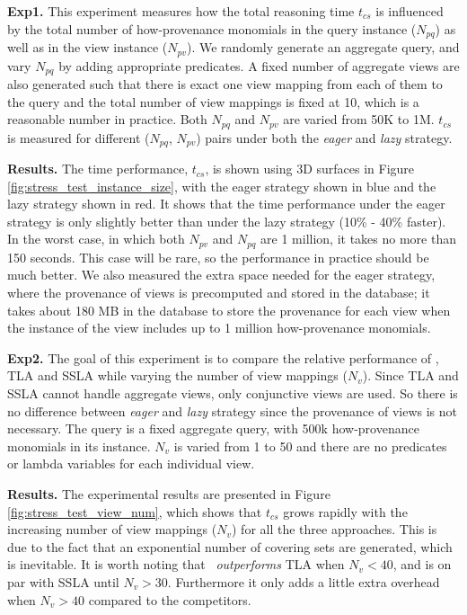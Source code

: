 \textbf{Exp1.}  This experiment measures how the total reasoning time $t_{cs}$ is influenced by the total number of how-provenance monomials in the query instance ($N_{pq}$) as well as 
in the view instance ($N_{pv}$). We randomly generate an aggregate query, and vary $N_{pq}$ by adding appropriate predicates. A fixed number of aggregate views are also generated such that there is exact one view mapping from each of them to the query and the total number of view mappings is fixed at 10, which is a reasonable number in practice. Both $N_{pq}$ and $N_{pv}$ are varied from 50K to 1M. $t_{cs}$ is measured for different ($N_{pq}$, $N_{pv}$) pairs under both the {\em eager} and {\em lazy} strategy.  

\textbf{Results.} 
The time performance, $t_{cs}$, is shown using 3D surfaces in Figure \ref{fig:stress_test_instance_size}, with the eager strategy shown in blue and the lazy strategy shown in red. It shows that the time performance under the eager strategy is only slightly better  than under the lazy strategy (10\% - 40\% faster). In the worst case, in which both $N_{pv}$ and $N_{pq}$ are 1 million, it takes no more than 150 seconds. This case will be rare, so the performance in practice should be much better. We also measured the extra space needed for the eager strategy, where the provenance of views is precomputed and stored in the database; it takes about 180 MB in the database to store the provenance for each view when the instance of the view includes up to 1 million how-provenance monomials. 

\textbf{Exp2.} The goal of this experiment is to compare the relative performance of \provalg, TLA and SSLA while varying the number of view mappings ($N_v$).
Since TLA and SSLA cannot handle aggregate views, only conjunctive views are used. So there is no difference between {\em eager} and {\em lazy} strategy since the provenance of views is not necessary. The query is a fixed aggregate query, with 500k how-provenance monomials in its instance. $N_v$ is varied from 1 to 50 and there are no predicates or lambda variables for each individual view. 

\textbf{Results.}
The experimental results are presented in Figure \ref{fig:stress_test_view_num}, which shows that $t_{cs}$ grows rapidly with the increasing number of view mappings ($N_v$) for all the three approaches. This is due to the fact that an exponential  number of covering sets are generated, which is inevitable. It is worth noting that \provalg\ \textit{outperforms} TLA when $N_v < 40$, and is on par with SSLA until $N_v >30$.
Furthermore it only adds a little extra overhead when $N_v > 40$ compared to the competitors. 


